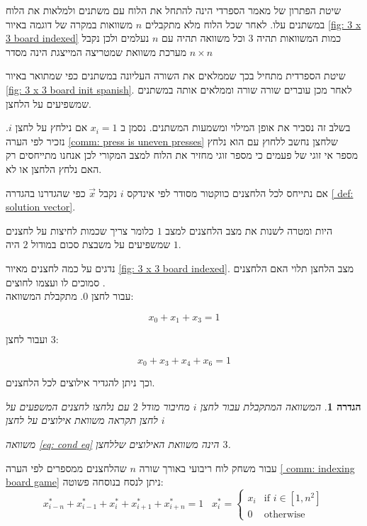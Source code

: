 \documentclass[12pt,twoside]{article}
\newtheorem{definition}{הגדרה}[section]
\begin{document}
שיטת הפתרון של מאמר הספרדי הינה להתחל את הלוח עם משתנים ולמלאות את הלוח במשתנים עלו.
לאחר שכל הלוח מלא מתקבלים 
$n$
משוואות במקרה של דוגמה 
באיור 
\ref{fig: 3 x 3 board indexed}
כמות המשוואות תהיה
$3$
וכל משוואה תהיה עם 
$n$
נעלמים
ולכן נקבל מערכת משוואת שמטריצה המייצגת הינה מסדר 
$n \times n$

שיטת הספרדית מתחיל בכך
שממלאים את השורה העליונה במשתנים
כפי שמתואר באיור 
\ref{fig: 3 x 3 board init spanish}.
לאחר מכן עוברים שורה שורה 
וממלאים אותה במשתנים שמשפיעים על הלחצן.

בשלב זה נסביר את אופן המילוי ומשמעות המשתנים.
נסמן ב
$x_i = 1$
אם נילחץ על לחצן 
$i$.
נזכיר לפי הערה 
\ref{comm: press is uneven presses}
שלחצן נחשב ללחוץ עם הוא נלחץ מספר אי זוגי של פעמים 
כי מספר זוגי מחזיר את הלוח למצב המקורי לכן
אנחנו מתייחסים רק האם נלחץ הלחצן או לא.

אם נתייחס לכל הלחצנים כווקטור מסודר לפי אינדקס
$i$
נקבל 
$\vec{x}$
כפי שהגדרנו בהגדרה 
\ref{ def: solution vector}.

היות ומטרה לשנות את מצב הלחצנים
למצב 
$1$
כלומר צריך שכמות לחיצות על לחצנים שמשפיעים על 
משבצת סכום במודול
$2$
היה 
$1$.

נדגים
על כמה לחצנים מאיור  
\ref{fig: 3 x 3 board indexed}.
מצב הלחצן תלוי האם הלחצנים 
סמוכים לו  ועצמו לחוצים .
\\
עבור 
לחצן 
$0$.
מתקבלת המשוואה:

\[ x_0 + x_1 + x_3 = 1\]

ועבור לחצן 
$3$:

\begin{equation}
    \label{eq: cond eq}
    x_0 + x_3 + x_4 + x_6 = 1
\end{equation}


וכך ניתן להגדיר אילוצים לכל הלחצנים.

\begin{definition}
    \label{ def: depndeciy equation}
    המשוואה המתקבלת
    עבור לחצן 
    $i$
    מחיבור מודל 
    $2$
    עם נלחצו לחצנים המשפעים על לחצן 
    תקראה
    משוואת אילוצים על לחצן 
    $i$
    
    משוואה 
    \ref{eq: cond eq}
    הינה משוואת האילוצים שללחצן
    $3$.
\end{definition}

עבור משחק לוח
ריבועי באורך שורה 
$n$
שהלחצנים ממספרים לפי הערה
\ref{ comm: indexing board game}
ניתן לנסח בנוסחה פשוטה:
\begin{equation}
    \label{eq: depndeciy equation}
    x^*_{i - n} + x^*_{i - 1} + x^*_{i} + x^*_{i + 1} + x^*_{i + n} = 1
    \hspace{10pt}
    x^*_i =
    \begin{cases}
        x_i & \text{if $i \in [1,n^2]$} \\
        0 & \text{otherwise}
    \end{cases}
\end{equation}
\end{document}
